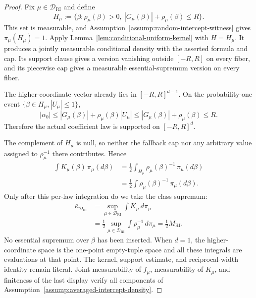 \begin{proof}
Fix $\mu\in\mathcal D_{\mathrm{RI}}$ and define
\[
H_\mu
:=\{\beta:\rho_\mu(\beta)>0,
             \ |G_\mu(\beta)|+\rho_\mu(\beta)\leq R\}.
\]
This set is measurable, and
Assumption~\ref{assump:random-intercept-witness} gives
$\pi_\mu(H_\mu)=1$.  Apply
Lemma~\ref{lem:conditional-uniform-kernel} with $H=H_\mu$.  It produces
a jointly measurable conditional density with the asserted formula and
cap.  Its support clause gives a version vanishing outside $[-R,R]$ on
every fiber, and its piecewise cap gives a measurable essential-supremum
version on every fiber.

The higher-coordinate vector already lies in $[-R,R]^{d-1}$.  On the
probability-one event $\{\beta\in H_\mu,|U_\mu|\leq1\}$,
\[
|\alpha_0|
\leq|G_\mu(\beta)|+\rho_\mu(\beta)|U_\mu|
\leq|G_\mu(\beta)|+\rho_\mu(\beta)
\leq R.
\]
Therefore the actual coefficient law is supported on $[-R,R]^d$.

The complement of $H_\mu$ is null, so neither the fallback cap nor any
arbitrary value assigned to $\rho_\mu^{-1}$ there contributes.  Hence
\[
\begin{aligned}
\int K_\mu(\beta)\,\pi_\mu(d\beta)
&=\frac12\int_{H_\mu}
  \rho_\mu(\beta)^{-1}\,\pi_\mu(d\beta)\\
&=\frac12\int
  \rho_\mu(\beta)^{-1}\,\pi_\mu(d\beta).
\end{aligned}
\]
Only after this per-law integration do we take the class supremum:
\[
\begin{aligned}
\bar\kappa_{\mathcal D_{\mathrm{RI}}}
&=\sup_{\mu\in\mathcal D_{\mathrm{RI}}}
  \int K_\mu\,d\pi_\mu\\
&=\frac12\sup_{\mu\in\mathcal D_{\mathrm{RI}}}
  \int\rho_\mu^{-1}\,d\pi_\mu
=\frac12M_{\mathrm{RI}}.
\end{aligned}
\]
No essential supremum over $\beta$ has been inserted.  When $d=1$, the
higher-coordinate space is the one-point empty-tuple space and all these
integrals are evaluations at that point.  The kernel, support estimate,
and reciprocal-width identity remain literal.  Joint measurability of
$f_\mu$, measurability of $K_\mu$, and finiteness of the last display
verify all components of
Assumption~\ref{assump:averaged-intercept-density}.
\end{proof}

